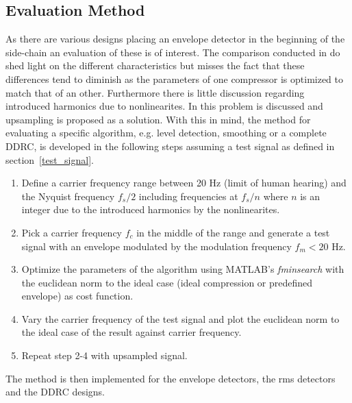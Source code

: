 \documentclass[../main2.tex]{subfiles}
\begin{document}
\subsection{Evaluation Method} \label{method_evaluation}
As there are various designs placing an envelope detector in the beginning of the side-chain an evaluation of these is of interest. The comparison conducted in \cite{reiss2012tutorial} do shed light on the different characteristics but misses the fact that these differences tend to diminish as the parameters of one compressor is optimized to match that of an other. Furthermore there is little discussion regarding introduced harmonics due to nonlinearites. In \cite{frindle1996implementation} this problem is discussed and upsampling is proposed as a solution. With this in mind, the method for evaluating a specific algorithm, e.g. level detection, smoothing or a complete DDRC, is developed in the following steps assuming a test signal as defined in section~\ref{test_signal}.
\begin{enumerate}
\item{Define a carrier frequency range between 20 Hz (limit of human hearing) and the Nyquist frequency $f_s/2$ including frequencies at $f_s/n$ where $n$ is an integer due to the introduced harmonics by the nonlinearites.}
\item{Pick a carrier frequency $f_c$ in the middle of the range and generate a test signal with an envelope modulated by the modulation frequency $f_m < 20$ Hz.}

\item{Optimize the parameters of the algorithm using  MATLAB\textsuperscript{\textregistered}'s \emph{fminsearch} with the euclidean norm to the ideal case (ideal compression or predefined envelope) as cost function.}
\item{Vary the carrier frequency of the test signal and plot the euclidean norm to the ideal case of the result against carrier frequency.}
\item{Repeat step 2-4 with upsampled signal.}
\end{enumerate}

The method is then implemented for the envelope detectors, the rms detectors and the DDRC designs.
\end{document}
